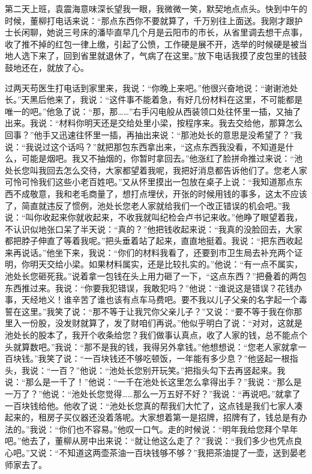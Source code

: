 \documentclass[12pt,oneside]{book}
\begin{document}
第二天上班，袁震海意味深长望我一眼，我微微一笑，默契地点点头。快到中午的时候，董柳打电话来说：``那点东西你不要就算了，千万别往上面送。我刚才跟护士长闲聊，她说三号床的潘毕直早几个月是云阳市的市长，从省里调去想干点事，收了推不掉的红包一律上缴，引起了公愤，工作硬是展不开，选举的时候硬是被当地人选下来了，回到省里就退休了，气病了在这里。''放下电话我摸了皮包里的钱鼓鼓地还在，就放了心。

过两天苟医生打电话到家里来，我说：``你晚上来吧。''他很兴奋地说：``谢谢池处长。''天黑后他来了，我说：``这件事不能着急，有好几份材料在这里，不可能都是唯一的吧。''他急了说：``那，那\ldots\ldots{}''右手闪电般从西装领口处往怀里一插，又抽了出来。我说：``材料你明天还是交给处里小梁，按程序来。我去交给他，那算怎么回事？''他手又迅速往怀里一插，再抽出来说：``那池处长的意思是没希望了？''我说：``我说过这个话吗？''就把那包东西拿出来，``这点东西我没看，不知道是什么，可能是烟吧。我又不抽烟的，你暂时拿回去。''他涨红了脸拼命推过来说：``池处长您叫我回去怎么交待，大家都望着我呢，我把好消息都告诉他们了。您老人家可怜可怜我们这些小老百姓吧。''又从怀里摸出一包放在桌子上说：``我知道那点东西不成敬意，我和老毛商量了，想打点埋伏，开张的时候用钱的事多，这太不应该了，简直就违反了惯例，池处长您老人家就给我们一个改正错误的机会吧。''我说：``叫你收起来你就收起来，不收我就叫纪检会卢书记来收。''他睁了眼望着我，不认识似地张口呆了半天说：``真的？''他把钱收起来说：``我真的没脸回去，大家都把脖子伸直了等着我呢。''把头垂着站了起来，直直地挺着。我说：``把东西收起来再说话。''他坐下来，我说：``你们的材料我看了，还要到市卫生局去补充两个证明，你明天交给小梁。如果材料属实，还是比较扎实的。''他说：``有一点不属实，池处长您砸死我。''说着拿一包钱在头上用力砸了一下，``这点东西？''把叠着的两包东西推过来。我说：``你要我犯错误，我敢犯吗？''他说：``谁说这是错误？花钱办事，天经地义！谁辛苦了谁也该有点车马费吧。要不我以儿子父亲的名字起一个毒誓在这里。''我笑了说：``那不等于让我咒你父亲儿子？''又说：``要不等于我在你那里入一份股，没发财就算了，发了财咱们再说。''他似乎明白了说：``对对，这就是池处长的股本了，我开个收条给您？我们做事认真点，收了人家的钱，总不能点个头就算数吧。''我说：``那不是我的钱，我得另外拿钱。''他想想说：``您老人家就拿一百块钱。''我笑了说：``一百块钱还不够吃顿饭，一年能有多少息？''他竖起一根指头，我说：``一百？''他说：``池处长您别开玩笑。''把指头勾下去再竖起来。我说：``那么是一千了！''他说：``一千在池处长这里怎么拿得出手？''我说：``那么是一万了？''他说：``池处长您觉得\ldots\ldots 那么一万五好不好？''我说：``再说吧。''就拿了一百块钱给他。他收了说：``池处长您真的帮我们大忙了，这点钱是我们七家人凑起来的，租房子买仪器还没着落呢。大家想着第一是招牌，招牌有了，钱总是有办法的。''我说：``你们也不容易。''他叹一口气。走的时候说：``明年我给您拜个早年吧。''他去了，董柳从房中出来说：``就让他这么走了？''我说：``我们多少也凭点良心吧。''又说：``不知道这两壶茶油一百块钱够不够？''我把茶油提了一壶，送到晏老师家去了。
\end{document}
